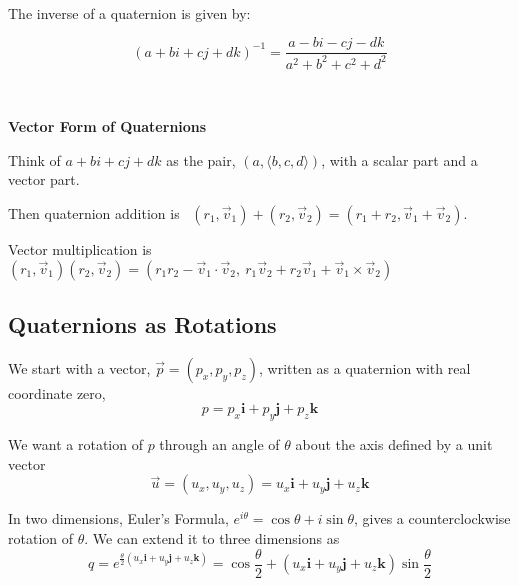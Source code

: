\documentclass[12pt]{article}
\begin{document}
\begin{spacing}{1.2}
\begin{tikzpicture}[x=10mm, y=10mm]
\end{tikzpicture}
\hfil
{}
\hfil

\

The inverse of a quaternion is given by:

$$ (a + bi + cj + dk)^{-1} = \frac{a - bi - cj - dk}{a^2 + b^2 + c^2 + d^2}$$

\

{\bf Vector Form of Quaternions}

Think of $a + bi + cj + dk$ as the pair, $(a, \langle b,c,d \rangle )$, with a scalar part and a vector part.  

Then quaternion addition is \ $(r_1, \vec{v}_1) + (r_2, \vec{v}_2) = (r_1 + r_2, \vec{v}_1 + \vec{v}_2)$.

Vector multiplication is $(r_1,\vec{v}_1) (r_2,\vec{v}_2) = (r_1r_2 - \vec{v}_1 \cdot \vec{v}_2, \ r_1\vec{v}_2 + r_2 \vec{v}_1 + \vec{v}_1 \times \vec{v}_2)$


\subsection{Quaternions as Rotations}

We start with a vector, $\vec{p} = (p_x, p_y, p_z)$, written as a quaternion with real coordinate zero, 
$$p = p_x \mathbf{i} + p_y \mathbf{j} + p_z \mathbf{k}$$

We want a rotation of $p$ through an angle of $\theta$ about the axis defined by a unit vector $$\vec{u} =  ( u_x, u_y, u_z ) = u_x \mathbf{i} + u_y \mathbf{j} + u_z \mathbf{k}$$ 

In two dimensions, Euler's Formula,  $e^{i\theta} = \cos \theta + i \sin \theta$, gives a counterclockwise rotation of $\theta$.  We can extend it to three dimensions as
$$q = e^{ 
	\frac{\theta}{2}
	( u_x \mathbf{i} + u_y \mathbf{j} + u_z \mathbf{k} )
	}
=
	\cos \frac{\theta}{2} + ( u_x \mathbf{i} + u_y \mathbf{j} + u_z \mathbf{k} ) \sin \frac{\theta}{2}
$$


\end{spacing}
\end{document}
